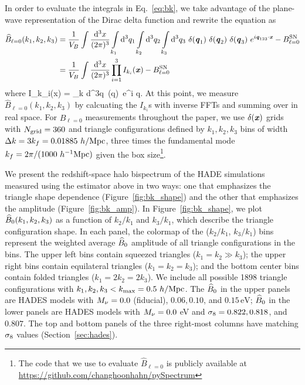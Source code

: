 In order to evaluate the integrals in Eq.~\ref{eq:bk}, we take advantage of the plane-wave 
representation of the Dirac delta function and rewrite the equation as
\begin{align} \label{eq:bk2} 
    \widehat{B}_{\ell = 0}(k_1,k_2, k_3) &= \frac{1}{V_B} \int\frac{{\rm d}^3x}{(2\pi)^3} \int\limits_{k_1}{\rm d}^3q_1 \int\limits_{k_2}{\rm d}^3q_2 \int\limits_{k_3}{\rm d}^3q_3~\delta({\textbf{\textit{q}}_1})~\delta({\textbf{\textit{q}}_2})~\delta({\textbf{\textit{q}}_3})~e^{i{\textbf{\textit{q}}_{123}}\cdot{\textbf{\textit{x}}}} - B^{\rm SN}_{\ell = 0}\\ 
    &= \frac{1}{V_B} \int\frac{{\rm d}^3x}{(2\pi)^3}\prod\limits_{i=1}^{3} I_{k_i}({\textbf{\textit{x}}}) - B^{\rm SN}_{\ell = 0} 
\end{align}
where 
\beq
I_{k_i}({\bfi x}) = \int\limits_k {\rm d}^3q~\delta({\bfi q})~e^{i {\bfi q}}. 
\eeq
At this point, we measure $\widehat{B}_{\ell = 0}(k_1, k_2, k_3)$ by calcuating the 
$I_{k_i}$s with inverse FFTs and summing over in real space. For $\widehat{B}_{\ell = 0}$
measurements throughout the paper, we use $\delta({\textbf{\textit{x}}})$ grids with $N_{\rm grid} = 360$ 
and triangle configurations defined by $k_1, k_2, k_3$ bins of width 
$\Delta k = 3 k_f = 0.01885~h/{\rm Mpc}$, three times the fundamental mode
$k_f = 2\pi/(1000~h^{-1}{\rm Mpc})$ given the box size\footnote{The code that we use to 
evaluate $\widehat{B}_{\ell = 0}$ is publicly available at \url{https://github.com/changhoonhahn/pySpectrum}}. 

We present the redshift-space halo bispectrum of the HADE simulations measured using 
the estimator above in two ways: one that emphasizes the triangle shape dependence 
(Figure~\ref{fig:bk_shape}) and the other that emphasizes the amplitude 
(Figure~\ref{fig:bk_amp}). In Figure~\ref{fig:bk_shape}, we plot $\widehat{B}_0(k_1, k_2, k_3)$ 
as a function of $k_2/k_1$ and $k_3/k_1$, which describe the triangle configuration shape. 
In each panel, the colormap of the ($k_2/k_1$, $k_3/k_1$) bins represent the weighted 
average $\widehat{B}_0$ amplitude of all triangle configurations in the bins. The upper left 
bins contain squeezed triangles ($k_1 = k_2 \gg k_3$); the upper right bins contain 
equilateral triangles ($k_1 = k_2 = k_3$); and the bottom center bins contain folded 
triangles ($k_1 = 2 k_2 = 2 k_3$). 
We include all possible 1898 triangle configurations with $k_1, k_2, k_3 < k_{\rm max} = 0.5~h/{\rm Mpc}$. 
The $\widehat{B}_0$ in the upper panels are HADES models with $M_\nu = 0.0$ (fiducial), $0.06, 0.10$, 
and $0.15\,\mathrm{eV}$; $\widehat{B}_0$ in the lower panels are  HADES models with $M_\nu = 0.0$ eV and 
$\sigma_8 = 0.822, 0.818$, and $0.807$. The top and bottom panels of the three right-most 
columns have matching $\sigma_8$ values (Section~\ref{sec:hades}).

